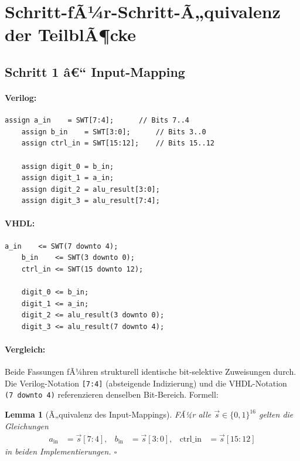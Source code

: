 ﻿\documentclass[12pt,a4paper]{report}
\newtheorem{lemma}[theorem]{Lemma}
\begin{document}
\section{Schritt-fÃ¼r-Schritt-Ã„quivalenz der TeilblÃ¶cke}
\label{subsec:schritte}

\subsection{Schritt 1 â€“ Input-Mapping}
\label{sssec:input_mapping}

\paragraph{Verilog:}
\begin{lstlisting}[style=hdlstyle, caption={Input-Mapping in Verilog}]
	assign a_in    = SWT[7:4];      // Bits 7..4
	assign b_in    = SWT[3:0];      // Bits 3..0
	assign ctrl_in = SWT[15:12];    // Bits 15..12
	
	assign digit_0 = b_in;
	assign digit_1 = a_in;
	assign digit_2 = alu_result[3:0];
	assign digit_3 = alu_result[7:4];
\end{lstlisting}

\paragraph{VHDL:}
\begin{lstlisting}[style=hdlstyle, caption={Input-Mapping in VHDL}]
	a_in    <= SWT(7 downto 4);
	b_in    <= SWT(3 downto 0);
	ctrl_in <= SWT(15 downto 12);
	
	digit_0 <= b_in;
	digit_1 <= a_in;
	digit_2 <= alu_result(3 downto 0);
	digit_3 <= alu_result(7 downto 4);
\end{lstlisting}

\paragraph{Vergleich:}
Beide Fassungen fÃ¼hren strukturell identische bit-selektive Zuweisungen durch.
Die Verilog-Notation \texttt{[7:4]} (absteigende Indizierung) und die
VHDL-Notation \texttt{(7~downto~4)} referenzieren denselben Bit-Bereich.
Formell:

\begin{lemma}[Ã„quivalenz des Input-Mappings]
	\label{lem:input_mapping}
	FÃ¼r alle $\vec{s} \in \{0,1\}^{16}$ gelten die Gleichungen
	\begin{align*}
		a_\mathrm{in} &= \vec{s}[7{:}4], &
		b_\mathrm{in} &= \vec{s}[3{:}0], &
		\mathrm{ctrl\_in} &= \vec{s}[15{:}12]
	\end{align*}
	in beiden Implementierungen.  \hfill $\square$
\end{lemma}
\end{document}
